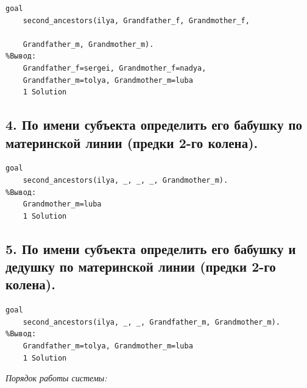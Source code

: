 \documentclass[a4paper,12pt]{article}
\begin{document}
	\begin{verbatim}
goal
	second_ancestors(ilya, Grandfather_f, Grandmother_f, 
	
	Grandfather_m, Grandmother_m).
%Вывод:
	Grandfather_f=sergei, Grandmother_f=nadya, 
	Grandfather_m=tolya, Grandmother_m=luba
	1 Solution
	\end{verbatim}
	
	\subsection*{4. По имени субъекта определить его бабушку по материнской линии (предки 2-го колена).}
	
	\begin{verbatim}
goal
	second_ancestors(ilya, _, _, _, Grandmother_m).
%Вывод:
	Grandmother_m=luba
	1 Solution
	\end{verbatim}
	
	\subsection*{5. По имени субъекта определить его бабушку и дедушку по материнской линии (предки 2-го колена).}
	
	\begin{verbatim}
goal
	second_ancestors(ilya, _, _, Grandfather_m, Grandmother_m).
%Вывод:
	Grandfather_m=tolya, Grandmother_m=luba
	1 Solution
	\end{verbatim}
	
	\textit{Порядок работы системы:}
	
\end{document}
